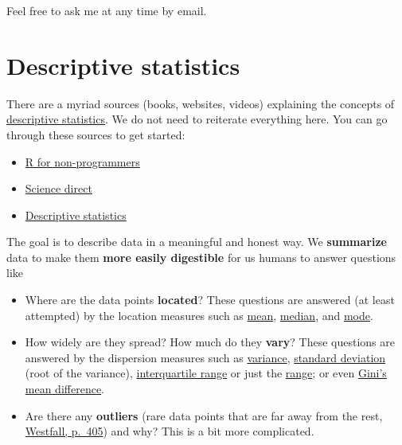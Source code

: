 \documentclass[
]{book}
\providecommand{\tightlist}{%
  \setlength{\itemsep}{0pt}\setlength{\parskip}{0pt}}
\begin{document}
Feel free to ask me at any time by email.

\chapter{Descriptive statistics}\label{descriptive_stats}

There are a myriad sources (books, websites, videos) explaining the concepts of \href{https://en.wikipedia.org/wiki/Descriptive_statistics}{descriptive statistics}.
We do not need to reiterate everything here. You can go through these sources to get started:

\begin{itemize}
\tightlist
\item
  \href{https://bookdown.org/daniel_dauber_io/r4np_book/descriptive-statistics.html}{R for non-programmers}
\item
  \href{https://www.sciencedirect.com/topics/social-sciences/descriptive-statistics}{Science direct}
\item
  \href{https://journals.lww.com/ijam/fulltext/2018/04010/descriptive_statistics.7.aspx}{Descriptive statistics}
\end{itemize}

The goal is to describe data in a meaningful and honest way.
We \textbf{summarize} data to make them \textbf{more easily digestible} for us humans to answer questions like

\begin{itemize}
\tightlist
\item
  Where are the data points \textbf{located}?
  These questions are answered (at least attempted) by the location measures such as
  \href{https://en.wikipedia.org/wiki/Mean}{mean}, \href{https://en.wikipedia.org/wiki/Median}{median}, and \href{https://en.wikipedia.org/wiki/Mode_(statistics)}{mode}.
\item
  How widely are they spread? How much do they \textbf{vary}?
  These questions are answered by the dispersion measures such as \href{https://en.wikipedia.org/wiki/Variance}{variance},
  \href{https://en.wikipedia.org/wiki/Standard_deviation}{standard deviation} (root of the variance),
  \href{https://en.wikipedia.org/wiki/Interquartile_range\#:~:text=The\%20IQR\%20of\%20a\%20set,a\%20median\%20calculated\%20as\%20follows.&text=The\%20second\%20quartile\%20Q2\%20is\%20the\%20same\%20as\%20the\%20ordinary\%20median.}{interquartile range}
  or just the \href{https://en.wikipedia.org/wiki/Range_(statistics)}{range}; or even \href{https://ideas.repec.org/a/mtn/ancoec/030208.html}{Gini's mean difference}.
\item
  Are there any \textbf{outliers} (rare data points that are far away from the rest, \href{https://www.routledge.com/Understanding-Regression-Analysis-A-Conditional-Distribution-Approach/Westfall-Arias/p/book/9780367493516}{Westfall, p.~405}) and why?
  This is a bit more complicated.
\end{itemize}
\end{document}
